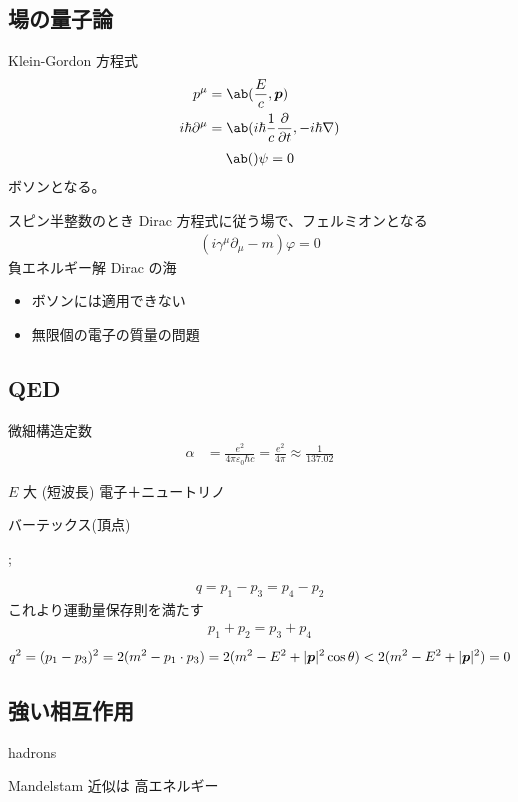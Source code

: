 \documentclass[a4paper,11pt]{jlreq}
\begin{document}
\subsection{場の量子論}
Klein-Gordon 方程式
\begin{align}
  p^\mu              & = \ab(\frac{E}{c}, \pp)                            \\
  i\hbar\partial^\mu & = \ab(i\hbar\frac{1}{c}\diffp{}{t}, -i\hbar\nabla)
\end{align}
\begin{align}
  \ab()\psi = 0
\end{align}
ボソンとなる。

スピン半整数のとき Dirac 方程式に従う場で、フェルミオンとなる
\begin{align}
  (i\gamma^\mu\partial_\mu - m)\varphi = 0
\end{align}
負エネルギー解
Dirac の海
\begin{itemize}
  \item ボソンには適用できない
  \item 無限個の電子の質量の問題
\end{itemize}


\subsection{QED}
微細構造定数
\begin{align}
  \alpha & = \frac{e^2}{4\pi\varepsilon_0\hbar c} = \frac{e^2}{4\pi} \approx \frac{1}{137.02}
\end{align}

$E$ 大 (短波長)
電子＋ニュートリノ

バーテックス(頂点)
\begin{center}
  ;
\end{center}
\begin{align}
  q = p_1 - p_3 = p_4 - p_2
\end{align}
これより運動量保存則を満たす
\begin{align}
  p_1 + p_2 = p_3 + p_4
\end{align}
\begin{align}
  q^2 = (p_1 - p_3)^2 = 2(m^2 - p_1\cdot p_3) = 2(m^2 - E^2 + |\bm{p}|^2\cos\theta) < 2(m^2 - E^2 + |\bm{p}|^2) = 0
\end{align}



\subsection{強い相互作用}
hadrons

Mandelstam
近似は 高エネルギー
\end{document}
